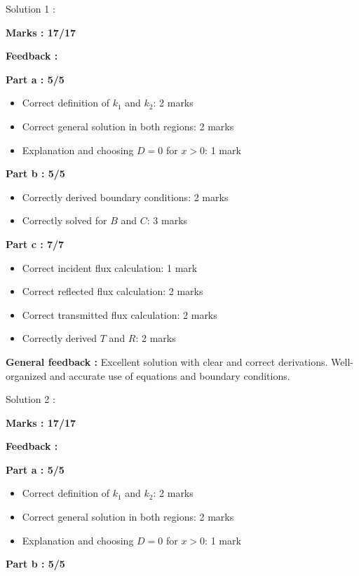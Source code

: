 \documentclass[a4paper,11pt]{article}
\begin{document}
Solution 1 :

\textbf{Marks : 17/17}

\textbf{Feedback :}

\textbf{Part a : 5/5}

\begin{itemize}
    \item Correct definition of $k_1$ and $k_2$: 2 marks
    \item Correct general solution in both regions: 2 marks
    \item Explanation and choosing $D = 0$ for $x>0$: 1 mark
\end{itemize}

\textbf{Part b : 5/5}

\begin{itemize}
    \item Correctly derived boundary conditions: 2 marks
    \item Correctly solved for $B$ and $C$: 3 marks
\end{itemize}

\textbf{Part c : 7/7}

\begin{itemize}
    \item Correct incident flux calculation: 1 mark
    \item Correct reflected flux calculation: 2 marks
    \item Correct transmitted flux calculation: 2 marks
    \item Correctly derived $T$ and $R$: 2 marks
\end{itemize}

\textbf{General feedback :}
Excellent solution with clear and correct derivations. Well-organized and accurate use of equations and boundary conditions.


Solution 2 :

\textbf{Marks : 17/17}

\textbf{Feedback :}

\textbf{Part a : 5/5}

\begin{itemize}
    \item Correct definition of $k_1$ and $k_2$: 2 marks
    \item Correct general solution in both regions: 2 marks
    \item Explanation and choosing $D = 0$ for $x>0$: 1 mark
\end{itemize}

\textbf{Part b : 5/5}
\end{document}
